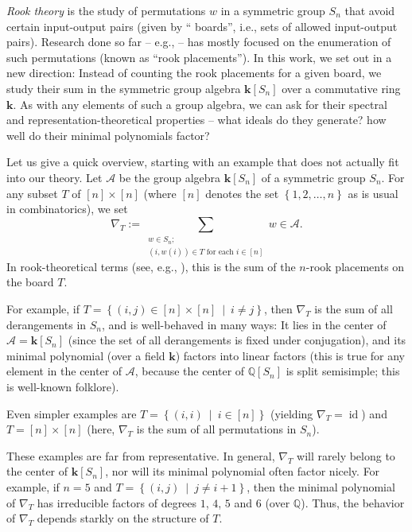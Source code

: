 \documentclass[numbers=enddot,12pt,final,onecolumn,notitlepage]{scrartcl}%
\numberwithin{exer}{subsection}
\theoremstyle{definition}
\let\sumnonlimits\sum
\renewcommand{\sum}{\sumnonlimits\limits}
\begin{document}
\emph{Rook theory} is the study of permutations $w$ in a symmetric group
$S_{n}$ that avoid certain input-output pairs (given by \textquotedblleft
boards\textquotedblright, i.e., sets of allowed input-output pairs). Research
done so far -- e.g., \cite{GJW75,BCHR11,LoeRem09} -- has mostly focused on the
enumeration of such permutations (known as \textquotedblleft rook
placements\textquotedblright). In this work, we set out in a new direction:
Instead of counting the rook placements for a given board, we study their sum
in the symmetric group algebra $\mathbf{k}\left[  S_{n}\right]  $ over a
commutative ring $\mathbf{k}$. As with any elements of such a group algebra,
we can ask for their spectral and representation-theoretical properties --
what ideals do they generate? how well do their minimal polynomials factor?

Let us give a quick overview, starting with an example that does not actually
fit into our theory. Let $\mathcal{A}$ be the group algebra $\mathbf{k}\left[
S_{n}\right]  $ of a symmetric group $S_{n}$. For any subset $T$ of $\left[
n\right]  \times\left[  n\right]  $ (where $\left[  n\right]  $ denotes the
set $\left\{  1,2,\ldots,n\right\}  $ as is usual in combinatorics), we set%
\[
\nabla_{T}:=\sum_{\substack{w\in S_{n};\\\left(  i,w\left(  i\right)  \right)
\in T\text{ for each }i\in\left[  n\right]  }}w\in\mathcal{A}.
\]
In rook-theoretical terms (see, e.g., \cite[\S 1.2]{BCHR11}), this is the sum
of the $n$-rook placements on the board $T$.

For example, if $T=\left\{  \left(  i,j\right)  \in\left[  n\right]
\times\left[  n\right]  \ \mid\ i\neq j\right\}  $, then $\nabla_{T}$ is the
sum of all derangements in $S_{n}$, and is well-behaved in many ways: It lies
in the center of $\mathcal{A}=\mathbf{k}\left[  S_{n}\right]  $ (since the set
of all derangements is fixed under conjugation), and its minimal polynomial
(over a field $\mathbf{k}$) factors into linear factors (this is true for any
element in the center of $\mathcal{A}$, because the center of $\mathbb{Q}%
\left[  S_{n}\right]  $ is split semisimple; this is well-known folklore).

Even simpler examples are $T=\left\{  \left(  i,i\right)  \ \mid\ i\in\left[
n\right]  \right\}  $ (yielding $\nabla_{T}=\operatorname*{id}$) and
$T=\left[  n\right]  \times\left[  n\right]  $ (here, $\nabla_{T}$ is the sum
of all permutations in $S_{n}$).

These examples are far from representative. In general, $\nabla_{T}$ will
rarely belong to the center of $\mathbf{k}\left[  S_{n}\right]  $, nor will
its minimal polynomial often factor nicely. For example, if $n=5$ and
$T=\left\{  \left(  i,j\right)  \ \mid\ j\neq i+1\right\}  $, then the minimal
polynomial of $\nabla_{T}$ has irreducible factors of degrees $1$, $4$, $5$
and $6$ (over $\mathbb{Q}$). Thus, the behavior of $\nabla_{T}$ depends
starkly on the structure of $T$.
\end{document}
